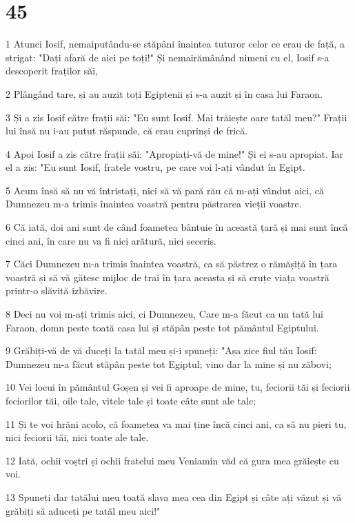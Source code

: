 \chapter{45}

\par 1 Atunci Iosif, nemaiputându-se stăpâni înaintea tuturor celor ce erau de față, a strigat: "Dați afară de aici pe toți!" Și nemairămânând nimeni cu el, Iosif s-a descoperit fraților săi,
\par 2 Plângând tare, și au auzit toți Egiptenii și s-a auzit și în casa lui Faraon.
\par 3 Și a zis Iosif către frații săi: "Eu sunt Iosif. Mai trăiește oare tatăl meu?" Frații lui însă nu i-au putut răspunde, că erau cuprinși de frică.
\par 4 Apoi Iosif a zis către frații săi: "Apropiați-vă de mine!" Și ei s-au apropiat. Iar el a zis: "Eu sunt Iosif, fratele vostru, pe care voi l-ați vândut în Egipt.
\par 5 Acum însă să nu vă întristați, nici să vă pară rău că m-ați vândut aici, că Dumnezeu m-a trimis înaintea voastră pentru păstrarea vieții voastre.
\par 6 Că iată, doi ani sunt de când foametea bântuie în această țară și mai sunt încă cinci ani, în care nu va fi nici arătură, nici seceriș.
\par 7 Căci Dumnezeu m-a trimis înaintea voastră, ca să păstrez o rămășiță în țara voastră și să vă gătesc mijloc de trai în țara aceasta și să cruțe viața voastră printr-o slăvită izbăvire.
\par 8 Deci nu voi m-ați trimis aici, ci Dumnezeu, Care m-a făcut ca un tată lui Faraon, domn peste toată casa lui și stăpân peste tot pământul Egiptului.
\par 9 Grăbiți-vă de vă duceți la tatăl meu și-i spuneți: "Așa zice fiul tău Iosif: Dumnezeu m-a făcut stăpân peste tot Egiptul; vino dar la mine și nu zăbovi;
\par 10 Vei locui în pământul Goșen și vei fi aproape de mine, tu, feciorii tăi și feciorii feciorilor tăi, oile tale, vitele tale și toate câte sunt ale tale;
\par 11 Și te voi hrăni acolo, că foametea va mai ține încă cinci ani, ca să nu pieri tu, nici feciorii tăi, nici toate ale tale.
\par 12 Iată, ochii voștri și ochii fratelui meu Veniamin văd că gura mea grăiește cu voi.
\par 13 Spuneți dar tatălui meu toată slava mea cea din Egipt și câte ați văzut și vă grăbiți să aduceți pe tatăl meu aici!"
